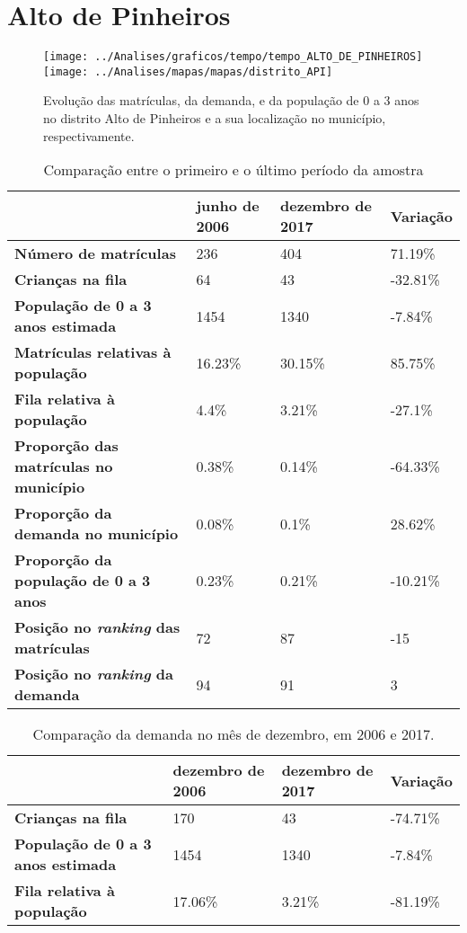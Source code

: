 \section{Alto de Pinheiros}
\begin{figure}[H]
\centering
\texttt{[image: ../Analises/graficos/tempo/tempo\_ALTO\_DE\_PINHEIROS]}
\texttt{[image: ../Analises/mapas/mapas/distrito\_API]}
\caption{Evolução das matrículas, da demanda, e da população de 0 a 3 anos no distrito Alto de Pinheiros e a sua localização no município, respectivamente.}
\end{figure}
\begin{table}[H]
\begin{tabular}{l|l|l|l}
\textbf{}                                      & \textbf{junho de 2006}       & \textbf{dezembro de 2017}    & \textbf{Variação} \\ \hline
\textbf{Número de matrículas}                  & 236 & 404 & 71.19\% \\ \hline
\textbf{Crianças na fila}                      & 64 & 43 & -32.81\% \\ \hline
\textbf{População de 0 a 3 anos estimada}      & 1454 & 1340 & -7.84\% \\ \hline
\textbf{Matrículas relativas à população}      & 16.23\% & 30.15\% & 85.75\% \\ \hline
\textbf{Fila relativa à população}             & 4.4\% & 3.21\% & -27.1\% \\ \hline
\textbf{Proporção das matrículas no município} & 0.38\% & 0.14\% & -64.33\% \\ \hline
\textbf{Proporção da demanda no município}     & 0.08\% & 0.1\% & 28.62\% \\ \hline
\textbf{Proporção da população de 0 a 3 anos}  & 0.23\% & 0.21\% & -10.21\% \\ \hline
\textbf{Posição no \textit{ranking} das matrículas}     & 72 & 87 & -15 \\ \hline
\textbf{Posição no \textit{ranking} da demanda}         & 94 & 91 & 3 \\ 
\end{tabular}
\caption{Comparação entre o primeiro e o último período da amostra}
\end{table}
\begin{table}[H]
\begin{tabular}{l|l|l|l}
\textbf{}                                 & \textbf{dezembro de 2006} & \textbf{dezembro de 2017} & \textbf{Variação} \\ \hline
\textbf{Crianças na fila}                      & 170 & 43 & -74.71\% \\ \hline
\textbf{População de 0 a 3 anos estimada}      & 1454 & 1340 & -7.84\% \\ \hline
\textbf{Fila relativa à população}             & 17.06\% & 3.21\% & -81.19\% \\
\end{tabular}
\caption{Comparação da demanda no mês de dezembro, em 2006 e 2017.}
\end{table}
